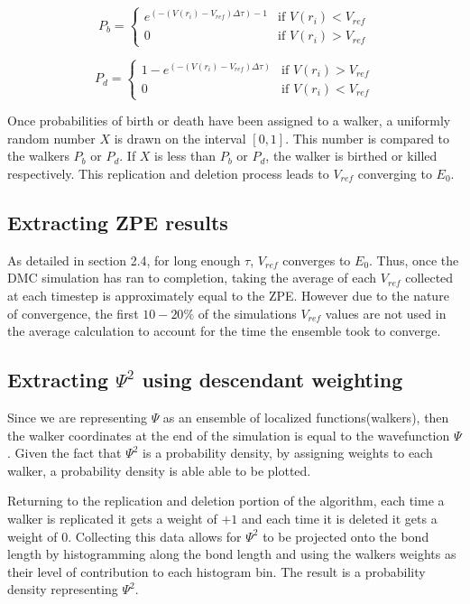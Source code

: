 \documentclass{article}
\begin{document}
\begin{equation}
P_b = \begin{cases}
e^{(-(V(r_{i})-V_{ref})\Delta\tau)-1} &\text{if $V(r_{i})<V_{ref}$}\\
0 &\text{if $V(r_{i})>V_{ref}$}
\end{cases}
\end{equation}

\begin{equation}
P_d = \begin{cases}
1-e^{(-(V(r_{i})-V_{ref})\Delta\tau)} &\text{if $V(r_{i})>V_{ref}$}\\
0 &\text{if $V(r_{i})<V_{ref}$}
\end{cases}
\end{equation}


Once probabilities of birth or death have been assigned to a walker, a uniformly random number $X$ is drawn on the interval $[0, 1]$. 
This number is compared to the walkers $P_{b}$ or $P_{d}$. If $X$ is less than $P_{b}$ or $P_{d}$, the walker is birthed or killed respectively. This replication and deletion process leads to $V_{ref}$ converging to $E_{0}$. 

\subsection{Extracting ZPE results}
As detailed in section 2.4, for long enough $\tau$, $V_{ref}$ converges to $E_{0}$. Thus, once the DMC simulation has ran to completion, taking the average of each $V_{ref}$ collected at each timestep is approximately equal to the ZPE. 
However due to the nature of convergence, the first $10-20\%$ of the simulations $V_{ref}$ values are not used in the average calculation to account for the time the ensemble took to converge. 


\subsection{Extracting $\Psi^2$ using descendant weighting}
Since we are representing $\Psi$ as an ensemble of localized functions(walkers), then the walker coordinates at the end of the simulation is equal to the wavefunction $\Psi$. 
Given the fact that $\Psi^2$ is a probability density, by assigning weights to each walker, a probability density is able able to be plotted. 

Returning to the replication and deletion portion of the algorithm, each time a walker is replicated it gets a weight of $+1$ and each time it is deleted it gets a weight of $0$. 
Collecting this data allows for $\Psi^2$ to be projected onto the bond length by histogramming along the bond length and using the walkers weights as their level of contribution to each histogram bin. 
The result is a probability density representing $\Psi^2$.
\end{document}
